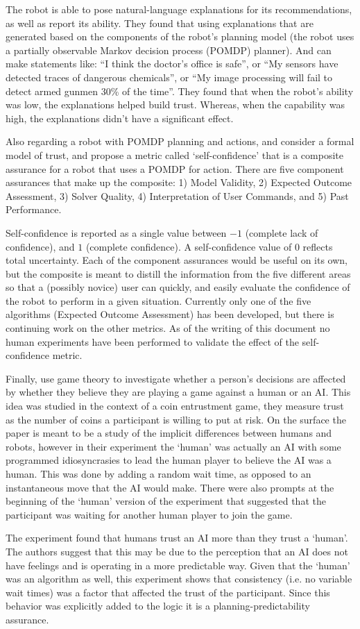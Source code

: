 The robot is able to pose natural-language explanations for its recommendations, as well as report its ability. They found that using explanations that are generated based on the components of the robot's planning model (the robot uses a partially observable Markov decision process (POMDP) planner). And can make statements like: ``I think the doctor's office is safe'', or ``My sensors have detected traces of dangerous chemicals'', or ``My image processing will fail to detect armed gunmen 30\% of the time''. They found that when the robot's ability was low, the explanations helped build trust. Whereas, when the capability was high, the explanations didn't have a significant effect.

Also regarding a robot with POMDP planning and actions, \citet{Aitken2016-fb} and \citet{Aitken2016-cv} consider a formal model of trust, and propose a metric called `self-confidence' that is a composite assurance for a robot that uses a POMDP for action. There are five component assurances that make up the composite: 1) Model Validity, 2) Expected Outcome Assessment, 3) Solver Quality, 4) Interpretation of User Commands, and 5) Past Performance. 

Self-confidence is reported as a single value between $-1$ (complete lack of confidence), and $1$ (complete confidence). A self-confidence value of $0$ reflects total uncertainty. Each of the component assurances would be useful on its own, but the composite is meant to distill the information from the five different areas so that a (possibly novice) user can quickly, and easily evaluate the confidence of the robot to perform in a given situation. Currently only one of the five algorithms (Expected Outcome Assessment) has been developed, but there is continuing work on the other metrics. As of the writing of this document no human experiments have been performed to validate the effect of the self-confidence metric.

Finally, \citet{Wu2016-ei} use game theory to investigate whether a person's decisions are affected by whether they believe they are playing a game against a human or an AI. This idea was studied in the context of a coin entrustment game, they measure trust as the number of coins a participant is willing to put at risk. On the surface the paper is meant to be a study of the implicit differences between humans and robots, however in their experiment the `human' was actually an AI with some programmed idiosyncrasies to lead the human player to believe the AI was a human. This was done by adding a random wait time, as opposed to an instantaneous move that the AI would make. There were also prompts at the beginning of the `human' version of the experiment that suggested that the participant was waiting for another human player to join the game.

The experiment found that humans trust an AI more than they trust a `human'. The authors suggest that this may be due to the perception that an AI does not have feelings and is operating in a more predictable way. Given that the `human' was an algorithm as well, this experiment shows that consistency (i.e. no variable wait times) was a factor that affected the trust of the participant. Since this behavior was explicitly added to the logic it is a planning-predictability assurance. 
